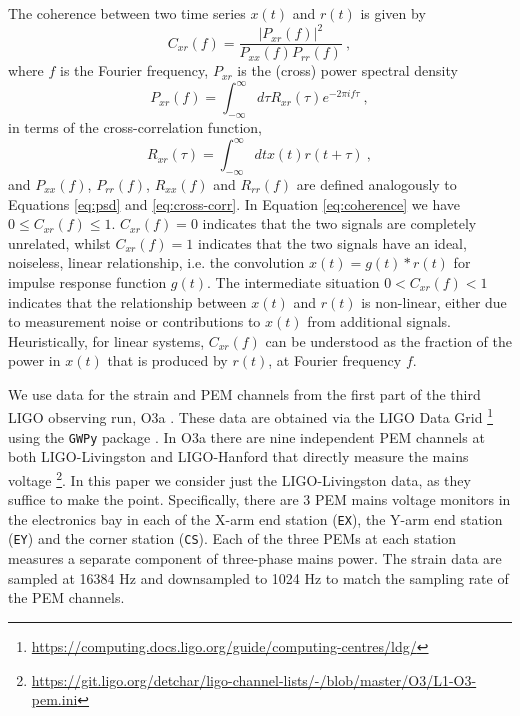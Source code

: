 \documentclass[pra,superscriptaddress,reprint,amsmath,amssymb,nofootinbib]{revtex4-2}
\begin{document}
The coherence between two time series $x(t)$ and $r(t)$ is given by 
\begin{equation}
	C_{xr}(f)	= \frac{|P_{xr}(f)|^2}{P_{xx}(f) P_{rr}(f)} \ , \label{eq:coherence}
\end{equation}
where $f$ is the Fourier frequency, $P_{xr}$ is the (cross) power spectral density
\begin{equation}
	P_{xr}(f)	= \int_{-\infty}^{\infty} d \tau R_{xr}(\tau) e^{-2 \pi i f \tau }  \ ,    \label{eq:psd}
\end{equation}
in terms of the cross-correlation function,
\begin{equation}
	R_{xr}(\tau) = \int_{-\infty}^{\infty} dt x(t) r(t+ \tau)  \ ,  \label{eq:cross-corr}
\end{equation}
and $P_{xx}(f)$, $P_{rr}(f)$, $R_{xx}(f)$ and $R_{rr}(f)$ are defined analogously to Equations \eqref{eq:psd} and \eqref{eq:cross-corr}. In Equation \eqref{eq:coherence} we have $0 \leq C_{xr}(f) \leq 1$. $C_{xr}(f) = 0$ indicates that the two signals are completely unrelated, whilst $C_{xr}(f) = 1$ indicates that the two signals have an ideal, noiseless, linear relationship, i.e. the convolution $x(t) = g(t) \ast r(t)$ for impulse response function $g(t)$.  The intermediate situation $ 0 < C_{xr}(f) < 1$ indicates that the relationship between $x(t)$ and $r(t)$ is non-linear, either due to measurement noise or contributions to $x(t)$ from additional signals. Heuristically, for linear systems, $C_{xr}(f)$ can be understood as the fraction of the power in $x(t)$ that is produced by $r(t)$, at Fourier frequency $f$. \newline 


We use data for the strain and PEM channels from the first part of the third LIGO observing run, O3a \cite{LIGO_O3}. These data are obtained via the LIGO Data Grid  \footnote{\url{https://computing.docs.ligo.org/guide/computing-centres/ldg/}} using the \texttt{GWPy} package \cite{gwpy}. In O3a there are nine independent PEM channels at both LIGO-Livingston and LIGO-Hanford that directly measure the mains voltage \footnote{\url{https://git.ligo.org/detchar/ligo-channel-lists/-/blob/master/O3/L1-O3-pem.ini}}. In this paper we consider just the LIGO-Livingston data, as they suffice to make the point. Specifically, there are 3 PEM mains voltage monitors in the electronics bay in each of the X-arm end station (\texttt{EX}), the Y-arm end station (\texttt{EY}) and the corner station (\texttt{CS}). Each of the three PEMs at each station measures a separate component of three-phase mains power. The strain data are sampled at 16384 Hz and downsampled to 1024 Hz to match the sampling rate of the PEM channels. \newline 
\end{document}
